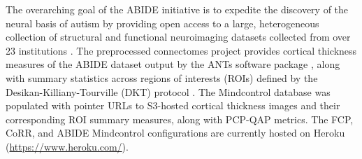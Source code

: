 The overarching goal of the ABIDE initiative is to expedite the discovery of the neural basis of autism by providing open access to a large, heterogeneous collection of structural and functional neuroimaging datasets collected from over 23 institutions \cite{Di_Martino_2013}. The preprocessed connectomes project provides cortical thickness measures of the ABIDE dataset output by the ANTs software package \cite{avants2009advanced}, along with summary statistics across regions of interests (ROIs) defined by the Desikan-Killiany-Tourville (DKT) protocol \cite{Klein_2012}. The Mindcontrol database was populated with pointer URLs to S3-hosted cortical thickness images and their corresponding ROI summary measures, along with PCP-QAP metrics. The FCP, CoRR, and ABIDE Mindcontrol configurations are currently hosted on Heroku (\href{http://www.heroku.com/}{https://www.heroku.com/}).

